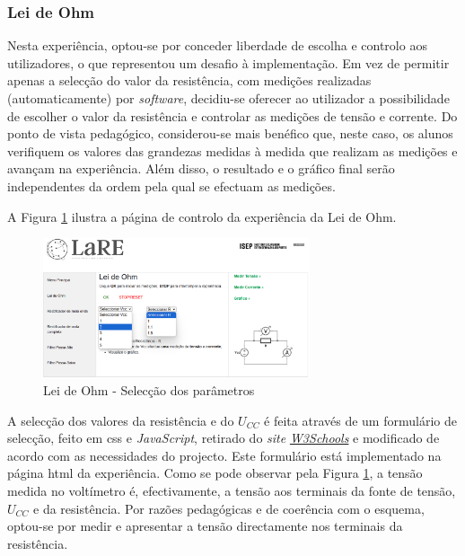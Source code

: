 \subsubsection{Lei de Ohm}
Nesta experiência, optou-se por conceder liberdade de escolha e controlo aos utilizadores, o que representou um desafio à implementação. Em vez de permitir apenas a selecção do valor da resistência, com medições realizadas (automaticamente) por \textit{software}, decidiu-se oferecer ao utilizador a possibilidade de escolher o valor da resistência e controlar as medições de tensão e corrente. Do ponto de vista pedagógico, considerou-se mais benéfico que, neste caso, os alunos verifiquem os valores das grandezas medidas à medida que realizam as medições e avançam na experiência. Além disso, o resultado e o gráfico final serão independentes da ordem pela qual se efectuam as medições.

A Figura \ref{fig:pagmenuCTRL} ilustra a página de controlo da experiência da Lei de Ohm. 

\begin{figure}[hbtp]
	\centering
	\includegraphics[width=0.7\textwidth]{figures/ohm_page_controlo-FULL.png}
	\caption{Lei de Ohm - Selecção dos parâmetros}
	\label{fig:pagmenuCTRL}
\end{figure}

A selecção dos valores da resistência e do $U_{CC}$ é feita através de um formulário de selecção, feito em \acrshort{css} e \textit{JavaScript}, retirado do \textit{site} \href{https://www.w3schools.com/howto/howto_custom_select.asp}{\textit{W3Schools}} e modificado de acordo com as necessidades do projecto. Este formulário está implementado na página \acrshort{html} da experiência. Como se pode observar pela Figura \ref{fig:pagmenuCTRL}, a tensão medida no voltímetro é, efectivamente, a tensão aos terminais da fonte de tensão, $U_{CC}$ e da resistência. Por razões pedagógicas e de coerência com o esquema, optou-se por medir e apresentar a tensão directamente nos terminais da resistência.


